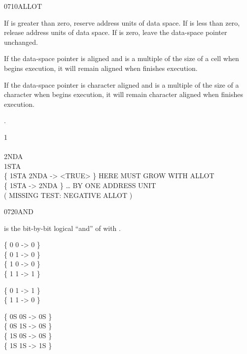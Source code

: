 \begin{worddef}{0710}{ALLOT}
\item {}

	If  is greater than zero, reserve  address units
	of data space. If  is less than zero, release 
	address units of data space. If  is zero, leave the
	data-space pointer unchanged.

	If the data-space pointer is aligned and  is a multiple
	of the size of a cell when  begins execution, it will
	remain aligned when  finishes execution.

	If the data-space pointer is character aligned and  is a
	multiple of the size of a character when  begins
	execution, it will remain character aligned when 
	finishes execution.

\see {}.

	\begin{defer}
	\testing
		 1  \\
		 \\
		 2NDA \\
		 1STA \\
		\{ 1STA 2NDA  -> <TRUE> \}	\tab {} HERE MUST GROW WITH ALLOT \\
		\{ 1STA  -> 2NDA \}			\tab[4.2]  {\ldots} BY ONE ADDRESS UNIT \\
		( MISSING TEST: NEGATIVE ALLOT )
	\end{defer}
\end{worddef}


\begin{worddef}{0720}{AND}
\item {}

	 is the bit-by-bit logical ``and'' of \param{x_1}
	with \param{x_2}.

	\begin{defer}
	\testing
		\{ 0 0  -> 0 \} \\
		\{ 0 1  -> 0 \} \\
		\{ 1 0  -> 0 \} \\
		\{ 1 1  -> 1 \}

		\{ 0  1  -> 1 \} \\
		\{ 1  1  -> 0 \}

		\{ 0S 0S  -> 0S \} \\
		\{ 0S 1S  -> 0S \} \\
		\{ 1S 0S  -> 0S \} \\
		\{ 1S 1S  -> 1S \}
	\end{defer}
\end{worddef}


